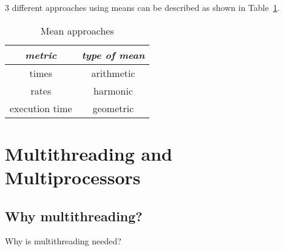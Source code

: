 \documentclass[english]{article}
\begin{document}
\(3\) different approaches using means can be described as shown in Table~\ref{tab:mean-approaches}.

\begin{table}[htbp]
  \centering
  \begin{tabular}{c|c}
    \textit{metric} & \textit{type of mean} \\ \hline
    times           & arithmetic            \\
    rates           & harmonic              \\
    execution time  & geometric             \\
  \end{tabular}
  \caption{Mean approaches}
  \label{tab:mean-approaches}
\end{table}

\clearpage

\section{Multithreading and Multiprocessors}

\subsection{Why multithreading?}

Why is multithreading needed?
\end{document}
